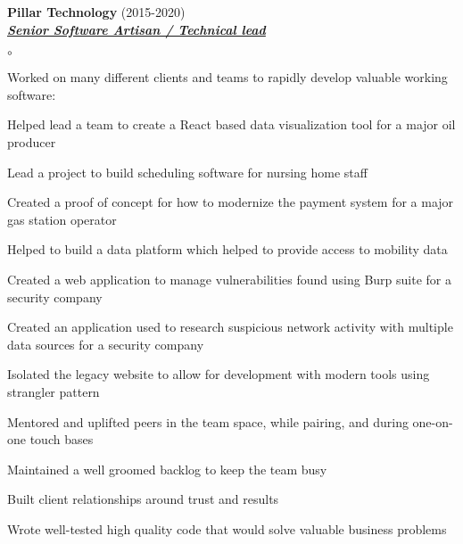 \documentclass{article}
\newcommand{\employer}[3]{{ \textbf{#1} (#2)\\ \underline{\textbf{\emph{#3}}}\\  }}
\newenvironment{achievements}{\begin{list}{$\circ$}{\topsep 0pt \itemsep -2pt}}{\vspace*{4pt}\end{list}}
\begin{document}
\employer{Pillar Technology}{2015-2020}{Senior Software Artisan / Technical lead}
	\begin{achievements}
	\item Worked on many different clients and teams to rapidly develop valuable working software:
	\item Helped lead a team to create a React based data visualization tool for a major oil producer
	\item Lead a project to build scheduling software for nursing home staff
	\item Created a proof of concept for how to modernize the payment system for a major gas station operator
	\item Helped to build a data platform which helped to provide access to mobility data
	\item Created a web application to manage vulnerabilities found using Burp suite for a security company
	\item Created an application used to research suspicious network activity with multiple data sources for a security company
	\item Isolated the legacy website to allow for development with modern tools using strangler pattern
	\item Mentored and uplifted peers in the team space, while pairing, and during one-on-one touch bases
	\item Maintained a well groomed backlog to keep the team busy
	\item Built client relationships around trust and results
	\item Wrote well-tested high quality code that would solve valuable business problems
	\end{achievements}
\end{document}
